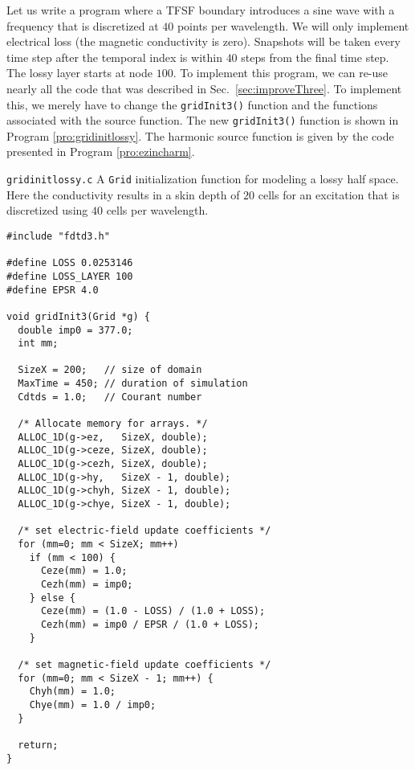 Let us write a program where a TFSF boundary introduces a sine wave
with a frequency that is discretized at $40$ points per wavelength.
We will only implement electrical loss (the magnetic conductivity is
zero).  Snapshots will be taken every time step after the temporal
index is within $40$ steps from the final time step.  The lossy layer
starts at node $100$.  To implement this program, we can re-use nearly
all the code that was described in Sec.\ \ref{sec:improveThree}.  To
implement this, we merely have to change the {\tt gridInit3()}
function and the functions associated with the source function.  The
new {\tt gridInit3()} function is shown in Program
\ref{pro:gridinitlossy}.  The harmonic source function is given by the
code presented in Program \ref{pro:ezincharm}.

\begin{program}
{\tt gridinitlossy.c} A {\tt Grid} initialization function for
modeling a lossy half space.  Here the conductivity results in a skin
depth of $20$ cells for an excitation that is discretized using $40$
cells per wavelength. \label{pro:gridinitlossy}
\codemiddle
\begin{lstlisting}
#include "fdtd3.h"

#define LOSS 0.0253146
#define LOSS_LAYER 100
#define EPSR 4.0 

void gridInit3(Grid *g) {
  double imp0 = 377.0;
  int mm;

  SizeX = 200;   // size of domain
  MaxTime = 450; // duration of simulation
  Cdtds = 1.0;   // Courant number

  /* Allocate memory for arrays. */
  ALLOC_1D(g->ez,   SizeX, double);
  ALLOC_1D(g->ceze, SizeX, double);
  ALLOC_1D(g->cezh, SizeX, double);
  ALLOC_1D(g->hy,   SizeX - 1, double);
  ALLOC_1D(g->chyh, SizeX - 1, double);
  ALLOC_1D(g->chye, SizeX - 1, double);

  /* set electric-field update coefficients */
  for (mm=0; mm < SizeX; mm++)
    if (mm < 100) {
      Ceze(mm) = 1.0;
      Cezh(mm) = imp0;
    } else {
      Ceze(mm) = (1.0 - LOSS) / (1.0 + LOSS);
      Cezh(mm) = imp0 / EPSR / (1.0 + LOSS);
    }

  /* set magnetic-field update coefficients */
  for (mm=0; mm < SizeX - 1; mm++) {
    Chyh(mm) = 1.0;
    Chye(mm) = 1.0 / imp0;
  }

  return;
}
\end{lstlisting}
\end{program}

